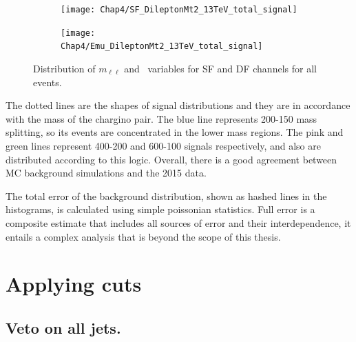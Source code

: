 \begin{figure}[!th]
\begin{subfigure}[t]{0.5\textwidth}
        \end{subfigure}
        \begin{subfigure}[t]{0.5\textwidth}
		\subcaption{} 
		\label{fig:SF_total_mt2}
        \texttt{[image: Chap4/SF\_DileptonMt2\_13TeV\_total\_signal]} 
        \end{subfigure} 
     \begin{subfigure}[t]{0.5\textwidth}
     \subcaption{}
     	\label{fig:DF_total_mt2}
        \texttt{[image: Chap4/Emu\_DileptonMt2\_13TeV\_total\_signal]} 
        \end{subfigure}
        \captionsetup{width=0.8\textwidth}
\caption{Distribution of $m_{\ell \ell}$ and \mttwo \, variables for SF and DF channels for all events.}	
        \label{fig:Elmu_total_histos}
\end{figure}

The dotted lines are the shapes of signal distributions and they are in accordance with the mass of the chargino pair. The blue line represents 200-150 mass splitting, so its events are concentrated in the lower mass regions. The pink and green lines represent 400-200 and 600-100 signals respectively, and also are distributed according to this logic. Overall, there is a good agreement between MC background simulations and the 2015 data. 

The total error of the background distribution, shown as hashed lines in the histograms, is calculated using simple poissonian statistics. Full error is a composite estimate that includes all sources of error and their interdependence, it entails a complex analysis that is beyond the scope of this thesis. 

\newpage
\section{Applying cuts}
\subsection{Veto on all jets.}

